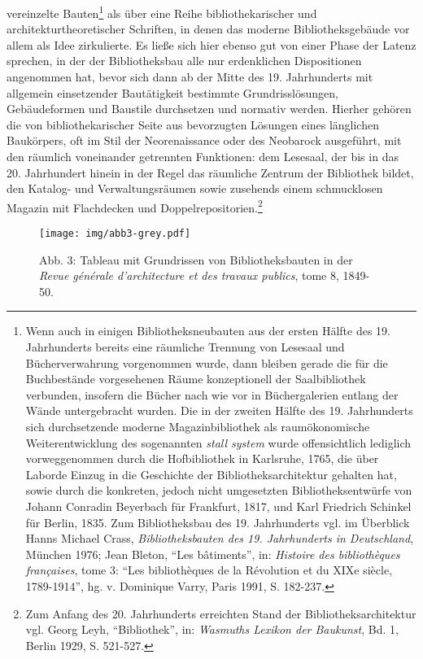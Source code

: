vereinzelte Bauten\footnote{Wenn auch in einigen Bibliotheksneubauten
  aus der ersten Hälfte des 19. Jahrhunderts bereits eine räumliche
  Trennung von Lesesaal und Bücherverwahrung vorgenommen wurde, dann
  bleiben gerade die für die Buchbestände vorgesehenen Räume
  konzeptionell der Saalbibliothek verbunden, insofern die Bücher nach
  wie vor in Büchergalerien entlang der Wände untergebracht wurden. Die
  in der zweiten Hälfte des 19. Jahrhunderts sich durchsetzende moderne
  Magazinbibliothek als raumökonomische Weiterentwicklung des
  sogenannten \emph{stall system} wurde offensichtlich lediglich
  vorweggenommen durch die Hofbibliothek in Karlsruhe, 1765, die über
  Laborde Einzug in die Geschichte der Bibliotheksarchitektur gehalten
  hat, sowie durch die konkreten, jedoch nicht umgesetzten
  Bibliotheksentwürfe von Johann Conradin Beyerbach für Frankfurt, 1817,
  und Karl Friedrich Schinkel für Berlin, 1835. Zum Bibliotheksbau des
  19. Jahrhunderts vgl. im Überblick Hanns Michael Crass,
  \emph{Bibliotheksbauten des 19. Jahrhunderts in Deutschland}, München
  1976; Jean Bleton, \enquote{Les bâtiments}, in: \emph{Histoire des
  bibliothèques françaises}, tome 3: \enquote{Les bibliothèques de la
  Révolution et du XIXe siècle, 1789-1914}, hg. v. Dominique Varry,
  Paris 1991, S. 182-237.} als über eine Reihe bibliothekarischer und
architekturtheoretischer Schriften, in denen das moderne
Bibliotheksgebäude vor allem als Idee zirkulierte. Es ließe sich hier
ebenso gut von einer Phase der Latenz sprechen, in der der
Bibliotheksbau alle nur erdenklichen Dispositionen angenommen hat, bevor
sich dann ab der Mitte des 19. Jahrhunderts mit allgemein einsetzender
Bautätigkeit bestimmte Grundrisslösungen, Gebäudeformen und Baustile
durchsetzen und normativ werden. Hierher gehören die von
bibliothekarischer Seite aus bevorzugten Lösungen eines länglichen
Baukörpers, oft im Stil der Neorenaissance oder des Neobarock
ausgeführt, mit den räumlich voneinander getrennten Funktionen: dem
Lesesaal, der bis in das 20. Jahrhundert hinein in der Regel das
räumliche Zentrum der Bibliothek bildet, den Katalog- und
Verwaltungsräumen sowie zusehends einem schmucklosen Magazin mit
Flachdecken und Doppelrepositorien.\footnote{Zum Anfang des 20.
  Jahrhunderts erreichten Stand der Bibliotheksarchitektur vgl. Georg
  Leyh, \enquote{Bibliothek}, in: \emph{Wasmuths Lexikon der Baukunst},
  Bd. 1, Berlin 1929, S. 521-527.}

\begin{figure}[htbp]
\centering
\texttt{[image: img/abb3-grey.pdf]}
\caption*{Abb. 3: Tableau mit Grundrissen von Bibliotheksbauten in der
\emph{Revue générale d'architecture et des travaux publics}, tome 8,
1849-50.}
\end{figure}

